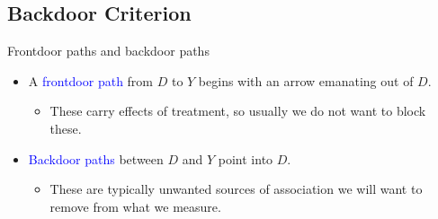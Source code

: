\documentclass[xcolor=dvipsnames]{beamer}
\begin{document}
%

\subsection{Backdoor Criterion}

\begin{frame}{Frontdoor paths and backdoor paths}
\small
\begin{itemize}
\item<2-> A \textcolor{Blue}{frontdoor path} from $D$ to $Y$ begins with an arrow emanating out of $D$. 
\begin{itemize}
\footnotesize
\item These carry effects of treatment, so usually we do not want to block these.
\end{itemize}
\small
\item<3-> \textcolor{Blue}{Backdoor paths} between $D$ and $Y$ point into $D$. 
\begin{itemize}
\footnotesize
\item These are typically unwanted sources of association we will want to remove from what we measure.
\end{itemize}
\end{itemize}
\end{frame}
\end{document}

